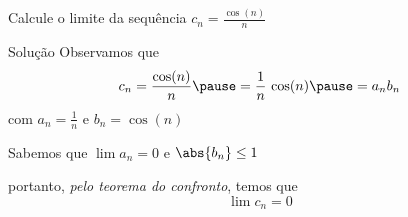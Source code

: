 \begin{question}
Calcule o limite da sequência
\(
  c_n = \frac{\cos(n)}{n}
\)
\end{question}

\begin{resolution}{Solução}
  Observamos que
  \[
    c_n
    = \frac{\cos(n)}{n}
    \pause
    = \frac{1}{n} \, \cos(n)
    \pause
        = a_n b_n
  \]
  \pause
  com
  \quad
  \pause
  \(
    a_n = \frac{1}{n}
  \)
  \pause
  \quad
  e
  \quad
  \(
    b_n = \cos(n)
  \)

  \pause
  \medskip
  Sabemos que
  \(
    \lim a_n = 0
  \)
  \quad
  \pause
  e
  \quad
  \(
    \abs{b_n} \leq 1
  \)

  \pause

  \smallskip
  portanto,
  \pause
  \emph{pelo teorema do confronto},
  \pause
  temos que
  \[
    \lim c_n = 0
  \]

\end{resolution}

